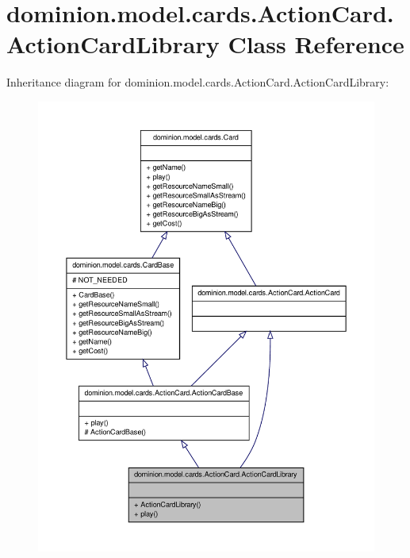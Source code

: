 \hypertarget{classdominion_1_1model_1_1cards_1_1ActionCard_1_1ActionCardLibrary}{\section{dominion.\-model.\-cards.\-Action\-Card.\-Action\-Card\-Library \-Class \-Reference}
\label{classdominion_1_1model_1_1cards_1_1ActionCard_1_1ActionCardLibrary}
}


\-Inheritance diagram for dominion.\-model.\-cards.\-Action\-Card.\-Action\-Card\-Library\-:
\nopagebreak
\begin{figure}[H]
\begin{center}
\leavevmode
\includegraphics[width=350pt]{classdominion_1_1model_1_1cards_1_1ActionCard_1_1ActionCardLibrary__inherit__graph}
\end{center}
\end{figure}



